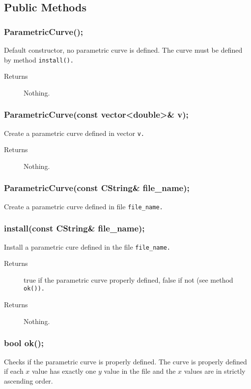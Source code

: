 \subsection{Public Methods}
\subsubsection{ParametricCurve();}
Default constructor, no parametric curve is defined.
The curve must be defined by method \tt install()\rm.

\begin{description}
    \item [Returns] Nothing.
\end{description} 

\subsubsection{ParametricCurve(const vector<double>\& v);}  
Create a parametric curve defined in vector \tt v\rm.
\begin{description}
    \item [Returns] Nothing.
\end{description} 

\subsubsection{ParametricCurve(const CString\& file\_name);}

Create a parametric curve defined in file \tt file\_name\rm.

\subsubsection{install(const CString\& file\_name);}
Install a parametric cure defined in the file \tt file\_name\rm.
    \begin{description}
       \item [Returns] true if  the parametric curve properly defined,
                       false if not (see method \tt ok())\rm.
    \end{description} 


\begin{description}
    \item [Returns] Nothing.
\end{description} 

\subsubsection{bool ok();} 
Checks if the parametric curve is properly defined. The curve is 
properly defined if each $x$ value has exactly one $y$ value in the file and
the $x$ values are in strictly ascending order.

